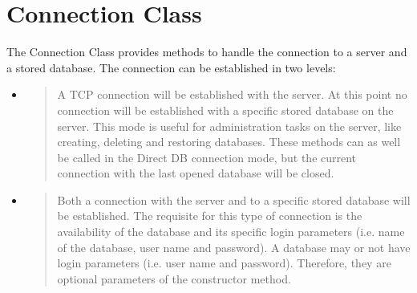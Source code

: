 \documentclass[letterpaper,10pt,english]{sphinxmanual}
\begin{document}
\section{Connection Class}
\label{\detokenize{index:connection-class}}
The Connection Class provides methods to handle the connection to a  server and a stored database. The connection
can be established in two levels:
\begin{itemize}
\item {} 
\begin{quote}

A TCP connection will be established with the  server. At this point no connection will be established with a
specific stored database on the server. This mode is useful for administration tasks on the  server, like
creating, deleting and restoring databases. These methods can as well be called in the Direct DB connection mode, but
the current connection with the last opened database will be closed.
\end{quote}

\item {} 
\begin{quote}

Both a connection with the  server and to a specific stored database will be established. The requisite for this
type of connection is the availability of the database and its specific login parameters (i.e. name of the database,
user name and password). A database may or not have login parameters (i.e. user name and password). Therefore, they
are optional parameters of the constructor method.
\end{quote}

\end{itemize}


\begin{sphinxVerbatim}[commandchars=\\\{\}]
   

     
          

   
\end{sphinxVerbatim}
\end{document}
